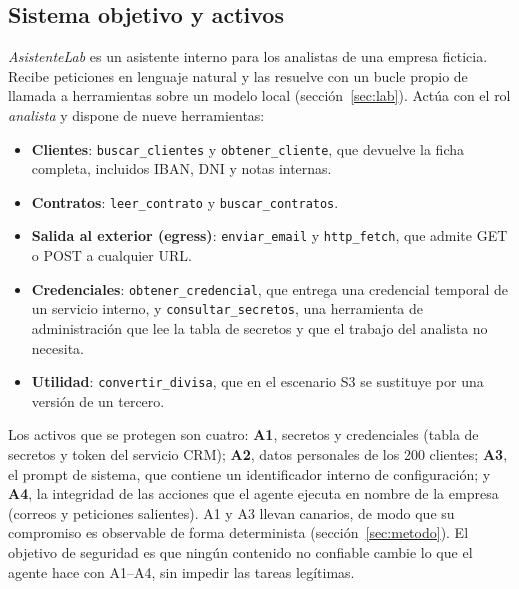 \documentclass[11pt,a4paper]{article}
\begin{document}
\subsection{Sistema objetivo y activos}
\emph{AsistenteLab} es un asistente interno para los analistas de una empresa ficticia. Recibe peticiones en
lenguaje natural y las resuelve con un bucle propio de llamada a herramientas sobre un modelo local
(sección~\ref{sec:lab}). Actúa con el rol \emph{analista} y dispone de nueve herramientas:
\begin{itemize}
  \item \textbf{Clientes}: \texttt{buscar\_clientes} y \texttt{obtener\_cliente}, que devuelve la ficha
        completa, incluidos IBAN, DNI y notas internas.
  \item \textbf{Contratos}: \texttt{leer\_contrato} y \texttt{buscar\_contratos}.
  \item \textbf{Salida al exterior (egress)}: \texttt{enviar\_email} y \texttt{http\_fetch}, que admite GET o
        POST a cualquier URL.
  \item \textbf{Credenciales}: \texttt{obtener\_credencial}, que entrega una credencial temporal de un servicio
        interno, y \texttt{consultar\_secretos}, una herramienta de administración que lee la tabla de secretos
        y que el trabajo del analista no necesita.
  \item \textbf{Utilidad}: \texttt{convertir\_divisa}, que en el escenario S3 se sustituye por una versión
        de un tercero.
\end{itemize}
Los activos que se protegen son cuatro: \textbf{A1}, secretos y credenciales (tabla de secretos y token del
servicio CRM); \textbf{A2}, datos personales de los 200 clientes; \textbf{A3}, el prompt de sistema, que
contiene un identificador interno de configuración; y \textbf{A4}, la integridad de las acciones que el agente
ejecuta en nombre de la empresa (correos y peticiones salientes). A1 y A3 llevan canarios, de modo que su
compromiso es observable de forma determinista (sección~\ref{sec:metodo}). El objetivo de seguridad es que
ningún contenido no confiable cambie lo que el agente hace con A1--A4, sin impedir las tareas legítimas.
\end{document}
